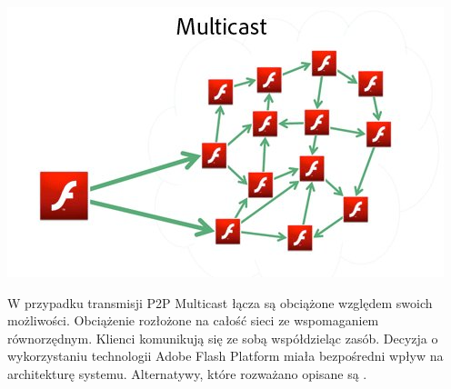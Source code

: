     \begin{center}
        \includegraphics[width=\textwidth]{img/adobe-p2p-multicast.jpg}
    \end{center}

W przypadku transmisji P2P Multicast łącza są obciążone względem swoich możliwości. Obciążenie rozłożone na całość sieci ze wspomaganiem równorzędnym. Klienci komunikują się ze sobą współdzieląc zasób. Decyzja o wykorzystaniu technologii Adobe Flash Platform miała bezpośredni wpływ na architekturę systemu. Alternatywy, które rozważano opisane są .

